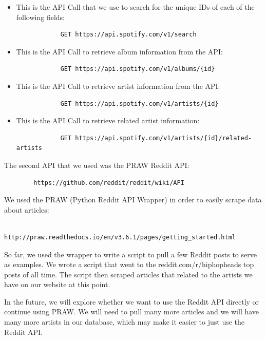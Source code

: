 \documentclass{scrartcl}
\begin{document}
    \begin{itemize}
        \item This is the API Call that we use to search for the unique IDs of each of the following fields:
        \begin{verbatim}
            GET https://api.spotify.com/v1/search
        \end{verbatim}

        \item This is the API Call to retrieve album information from the API:
        \begin{verbatim}
            GET https://api.spotify.com/v1/albums/{id}
        \end{verbatim}

        \item This is the API Call to retrieve artist information from the API:
        \begin{verbatim}
            GET https://api.spotify.com/v1/artists/{id}
        \end{verbatim}

        \item This is the API Call to retrieve related artist information:
        \begin{verbatim}
            GET https://api.spotify.com/v1/artists/{id}/related-artists
        \end{verbatim}
    \end{itemize}

    \noindent
    The second API that we used was the PRAW Reddit API:
    \begin{verbatim}
        https://github.com/reddit/reddit/wiki/API
    \end{verbatim}

    \noindent
    We used the PRAW (Python Reddit API Wrapper) in order to easily scrape data about articles:
    \begin{verbatim}
        http://praw.readthedocs.io/en/v3.6.1/pages/getting_started.html
    \end{verbatim}

    So far, we used the wrapper to write a script to pull a few Reddit posts to serve as examples. We wrote a script that went to the reddit.com/r/hiphopheads top posts of all time. The script then scraped articles that related to the artists we have on our website at this point.

    In the future, we will explore whether we want to use the Reddit API directly or continue using PRAW. We will need to pull many more articles and we will have many more artists in our database, which may make it easier to just use the Reddit API.\\
\end{document}
